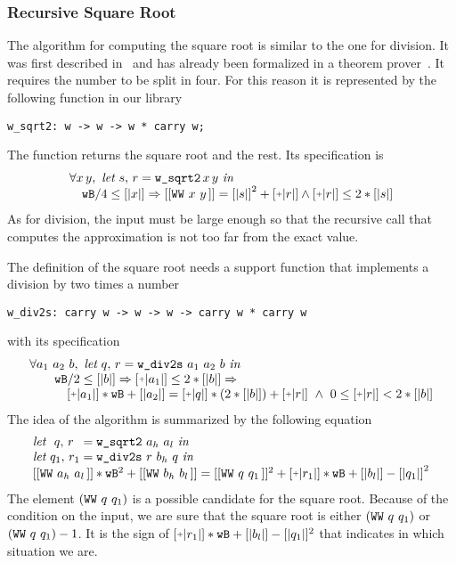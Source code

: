\subsubsection{Recursive Square Root}

The algorithm for computing the square root is similar to the one for division.
It was first described in~\cite{RecSqrt} and has already been formalized in a 
theorem prover~\cite{BerMagZim02}. It requires the number to be split
in four. For this reason it is represented by the following function in our
library
\begin{verbatim}
w_sqrt2: w -> w -> w * carry w;
\end{verbatim}
The function returns the square root and the rest.
Its specification is
$$\begin{array}{l}
\forall x\, y,\,\, \textit{let}\,\, s,\, r = \texttt{w\_sqrt2}\, x\, y\,\, \textit{in}\\
\hskip10pt \wB / 4 \le [|x|] \Rightarrow [[\WW x y]] = {[|s|]} ^ 2 + \ICP{r} \land \ICP{r} \le 2 * [|s|]
\end{array}
$$
As for division, the input must be large enough so that the recursive call
that computes the approximation is not too far from the exact value. 

The definition of the square root needs a support function that implements a division
by two times a number
\begin{verbatim}
w_div2s: carry w -> w -> w -> carry w * carry w
\end{verbatim}
with its specification
$$\begin{array}{l}
\forall a_1\,\, a_2\,\, b, \,\, \textit{let}\,\, q,\, r = \texttt{w\_div2s}\,\, a_1\,\, a_2\,\, b\,\, \textit{in}\\
\hskip20pt \wB / 2 \le [|b|] \Rightarrow \ICP{a_1} \le 2 * [|b|] \Rightarrow\\
\hskip30pt \ICP{a_1} * \wB + [|a_2|] = \ICP{q} *  (2 * [|b|]) + \ICP{r} \,\, \land\,\, 0 \le \ICP{r} < 2 * [|b|]
\end{array}
$$
The idea of the algorithm is summarized by the following equation
$$\begin{array}{l}
\textit{let}\,\,\,\, q ,\, r\,\,\, = \texttt{w\_sqrt2}\,\, {a_h}\,\, {a_l}\,\, \textit{in}\\
\textit{let}\,\, q_1 ,\, r_1 = \texttt{w\_div2s}\,\, r\,\, {b_h}\,\, q\,\, \textit{in}\\
{[[\WW {a_h} {a_l}]]} * \wB ^ 2 + [[\WW {b_h} {b_l}]] =
    [[\WW q {q_1}]] ^ 2 + \ICP{r_1} * \wB + [|{b_l}|] - {[|q_1|]} ^ 2 \\
\end{array}
$$
The element $(\texttt{WW}\,\,q\,\,q_1\,\!)$ is a possible candidate
for the square root. Because of the condition on
the input, we are sure that the square root is either $(\texttt{WW}\,\,q\,\,q_1\,\!)$ or
$(\texttt{WW}\,\,q\,\,q_1\,\!) - 1$. It is the sign of $\ICP{r_1} * \wB + 
[|{b_l}|] - [|q_1|] ^ 2$ that indicates in which situation we are. 
